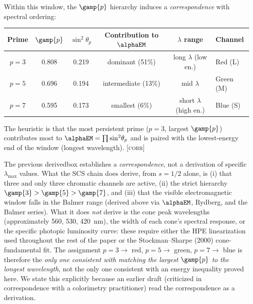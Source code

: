 \documentclass[12pt,a4paper]{article}
\begin{document}
\begin{derivedbox}
Within this window, the $\gamp{p}$ hierarchy induces a
\emph{correspondence} with spectral ordering:
\begin{center}
\begin{tabular}{cccccl}
\toprule
Prime & $\gamp{p}$ & $\sin^2\!\theta_p$ & Contribution to $\alphaEM$ & $\lambda$ range & Channel \\
\midrule
$p = 3$ & 0.808 & 0.219 & dominant (51\%) & long $\lambda$ (low en.) & Red (L) \\
$p = 5$ & 0.696 & 0.194 & intermediate (13\%) & mid $\lambda$ & Green (M) \\
$p = 7$ & 0.595 & 0.173 & smallest (6\%) & short $\lambda$ (high en.) & Blue (S) \\
\bottomrule
\end{tabular}
\end{center}

The heuristic is that the most persistent prime ($p = 3$, largest
$\gamp{p}$) contributes most to $\alphaEM = \prod \sin^2\!\theta_p$
and is paired with the lowest-energy end of the window (longest
wavelength). \textsc{[corr]}
\end{derivedbox}

\begin{remark}
The previous derivedbox establishes a \emph{correspondence}, not a
derivation of specific $\lambda_{\max}$ values. What the SCS chain
does derive, from $s = 1/2$ alone, is (i) that three and only three
chromatic channels are active, (ii) the strict hierarchy
$\gamp{3} > \gamp{5} > \gamp{7}$, and (iii) that the visible
electromagnetic window falls in the Balmer range (derived above via
$\alphaEM$, Rydberg, and the Balmer series). What it does \emph{not}
derive is the cone peak wavelengths (approximately 560, 530, 420~nm),
the width of each cone's spectral response, or the specific photopic
luminosity curve: these require either the HPE linearization used
throughout the rest of the paper or the Stockman--Sharpe (2000)
cone-fundamental fit. The assignment $p=3 \to$ red, $p=5 \to$ green,
$p=7 \to$ blue is therefore the \emph{only one consistent with
matching the largest $\gamp{p}$ to the longest wavelength}, not the
only one consistent with an energy inequality proved here. We state
this explicitly because an earlier draft (criticized in correspondence
with a colorimetry practitioner) read the correspondence as a
derivation.
\end{remark}
\end{document}
